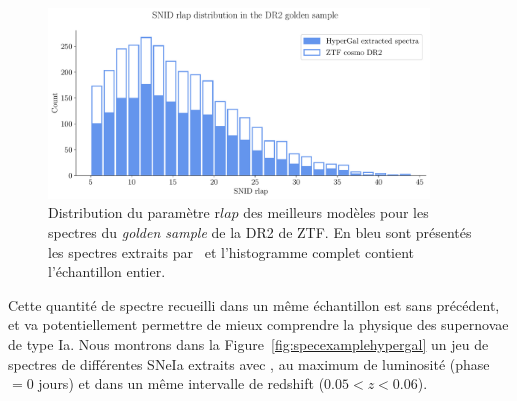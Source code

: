\documentclass[../main/main.tex]{subfiles}
\begin{document}
\begin{figure}[ht]
  \centering
  \includegraphics[width=0.9\textwidth]{../figures/09_dr2/rlapdistribution_dr2.pdf}
  \caption[Distribution du paramètre r$lap$ des meilleurs modèles
   pour les spectres du \textit{golden sample} de la DR2 de ZTF.]{Distribution du paramètre r$lap$ des meilleurs modèles
   pour les spectres du \textit{golden sample} de la DR2 de
  ZTF. En bleu sont présentés les spectres extraits par \hypergal\ et
  l'histogramme complet contient l'échantillon entier. }
  \label{fig:rlapdistribution}
\end{figure}


Cette quantité de spectre recueilli dans un même échantillon est sans
précédent, et va potentiellement permettre de mieux comprendre la
physique des supernovae de type Ia. Nous montrons dans la
Figure~\ref{fig:specexamplehypergal} un jeu de spectres de
différentes SNeIa extraits avec \hypergal, au maximum de luminosité (phase $=0$ jours) et
dans un même intervalle de redshift ($0.05<z<0.06$). 
\end{document}
